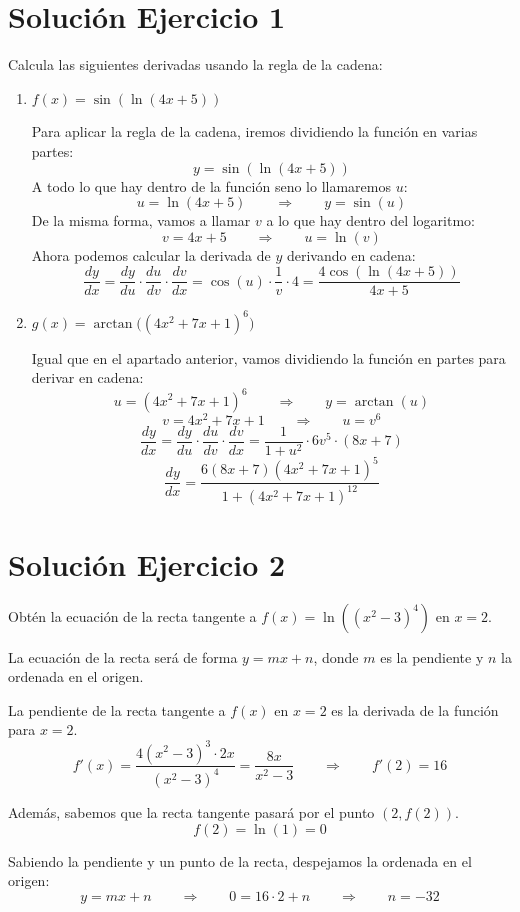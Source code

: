 \documentclass[12pt]{article}
\begin{document}
\section*{Solución Ejercicio 1}
Calcula las siguientes derivadas usando la regla de la cadena:

\begin{enumerate}[label=\alph*)]
\item \(f(x)=\sin(\ln(4x+5))\)

Para aplicar la regla de la cadena, iremos dividiendo la función en varias partes:
\[
y=\sin(\ln(4x+5))
\]
A todo lo que hay dentro de la función seno lo llamaremos \(u\):
\[
u=\ln(4x+5)\qquad \Rightarrow \qquad y=\sin(u)
\]
De la misma forma, vamos a llamar \(v\) a lo que hay dentro del logaritmo:
\[
v=4x+5 \qquad \Rightarrow \qquad u=\ln(v)
\]
Ahora podemos calcular la derivada de \(y\) derivando en cadena:
\[
\frac{dy}{dx}=\frac{dy}{du}\cdot \frac{du}{dv}\cdot \frac{dv}{dx}
= \cos(u)\cdot \frac{1}{v}\cdot 4
= \frac{4\cos(\ln(4x+5))}{4x+5}
\]

\item \(g(x)=\arctan\big((4x^2+7x+1)^6\big)\)

Igual que en el apartado anterior, vamos dividiendo la función en partes para derivar en cadena:
\[
u=(4x^2+7x+1)^6 \qquad \Rightarrow \qquad y=\arctan(u)
\]
\[
v=4x^2+7x+1 \qquad \Rightarrow \qquad u=v^6
\]
\[
\frac{dy}{dx}=\frac{dy}{du}\cdot \frac{du}{dv}\cdot \frac{dv}{dx}
=\frac{1}{1+u^2}\cdot 6v^5\cdot (8x+7)
\]
\[
\frac{dy}{dx}
=\frac{6(8x+7)(4x^2+7x+1)^5}{1+(4x^2+7x+1)^{12}}
\]
\end{enumerate}

\section*{Solución Ejercicio 2}
Obtén la ecuación de la recta tangente a \(f(x)=\ln((x^2-3)^4)\) en \(x=2\).

La ecuación de la recta será de forma \(y=mx+n\), donde \(m\) es la pendiente y
\(n\) la ordenada en el origen.

La pendiente de la recta tangente a \(f(x)\) en \(x=2\) es la derivada de la función
para \(x=2\).
\[
f'(x)=\frac{4(x^2-3)^3\cdot 2x}{(x^2-3)^4}
=\frac{8x}{x^2-3}
\qquad \Rightarrow \qquad
f'(2)=16
\]

Además, sabemos que la recta tangente pasará por el punto \((2,f(2))\).
\[
f(2)=\ln(1)=0
\]

Sabiendo la pendiente y un punto de la recta, despejamos la ordenada en el
origen:
\[
y=mx+n \qquad \Rightarrow \qquad 0=16\cdot 2+n \qquad \Rightarrow \qquad n=-32
\]
\end{document}
